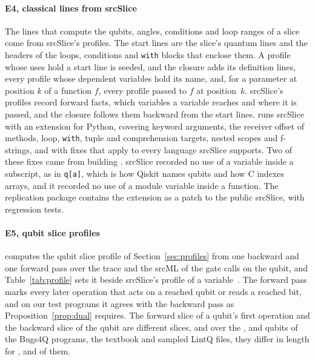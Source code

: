 \paragraph*{E4, classical lines from srcSlice}
The lines that compute the qubits, angles, conditions and loop ranges of a slice come from srcSlice's
profiles. The start lines are the slice's quantum lines and the headers of the loops, conditions and
\texttt{with} blocks that enclose them. A profile whose uses hold a start line is seeded, and the closure
adds its definition lines, every profile whose dependent variables hold its name, and, for a parameter at
position $k$ of a function $f$, every profile passed to $f$ at position~$k$. srcSlice's profiles record
forward facts, which variables a variable reaches and where it is passed, and the closure follows them
backward from the start lines. \tool{} runs srcSlice with an
extension for Python, covering keyword arguments, the receiver offset of methods, loop, \texttt{with}, tuple
and comprehension targets, nested scopes and f-strings, and with fixes that apply to every language
srcSlice supports. Two of these fixes came from building \tool{}. srcSlice recorded no use of a variable
inside a subscript, as in \texttt{q[a]}, which is how Qiskit names qubits and how C indexes arrays, and it
recorded no use of a module variable inside a function. The replication package contains the extension as
a patch to the public srcSlice, with regression tests.

\paragraph*{E5, qubit slice profiles}
\tool{} computes the qubit slice profile of Section~\ref{sec:profiles} from one backward and one forward pass
over the trace and the srcML of the gate calls on the qubit, and Table~\ref{tab:profile} sets it beside
srcSlice's profile of a variable~\cite{alomari2014srcslice}. The forward pass marks every later operation that
acts on a reached qubit or reads a reached bit, and on our test programs it agrees with the backward pass as
Proposition~\ref{prop:dual} requires. The forward slice of a qubit's first operation and the backward slice of
the qubit are different slices, and over the
\numProfBugsQubits{}, \numProfTextQubits{} and \numProfLintqQubits{} qubits of the Bugs4Q programs, the
textbook and \numProfLintqSample{} sampled LintQ files, they differ in length for
\numProfBugsFwdNeBwd{}, \numProfTextFwdNeBwd{} and \numProfLintqFwdNeBwd{} of them.

